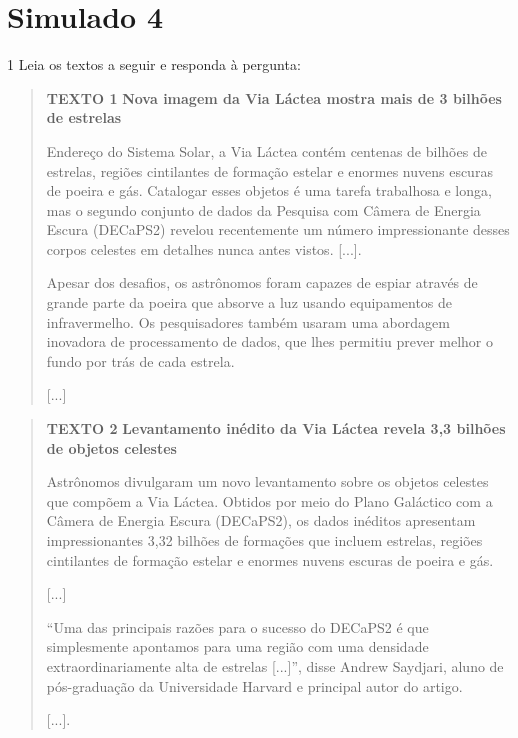 \chapter{Simulado 4}

\num{1} Leia os textos a seguir e responda à pergunta:

\begin{quote}
\textbf{TEXTO 1}
\textbf{Nova imagem da Via Láctea mostra mais de 3 bilhões de
estrelas}

Endereço do Sistema Solar, a Via Láctea contém centenas de bilhões de
estrelas, regiões cintilantes de formação estelar e enormes nuvens
escuras de poeira e gás. Catalogar esses objetos é uma tarefa trabalhosa
e longa, mas o segundo conjunto de dados da Pesquisa com Câmera de
Energia Escura (DECaPS2) revelou recentemente um número impressionante
desses corpos celestes em detalhes nunca antes vistos. {[}...{]}.

Apesar dos desafios, os astrônomos foram capazes de espiar através de
grande parte da poeira que absorve a luz usando equipamentos de
infravermelho. Os pesquisadores também usaram uma abordagem inovadora de
processamento de dados, que lhes permitiu prever melhor o fundo por trás
de cada estrela.

{[}...{]}

\end{quote}

\begin{quote}
\textbf{TEXTO 2}
\textbf{Levantamento inédito da Via Láctea revela 3,3 bilhões
de objetos celestes}

Astrônomos divulgaram um novo levantamento sobre os objetos celestes
que compõem a Via Láctea. Obtidos por meio do Plano Galáctico com a
Câmera de Energia Escura (DECaPS2), os dados inéditos apresentam
impressionantes 3,32 bilhões de formações que incluem estrelas, regiões
cintilantes de formação estelar e enormes nuvens escuras de poeira e
gás.

{[}...{]}

“Uma das principais razões para o sucesso do DECaPS2 é que simplesmente
apontamos para uma região com uma densidade extraordinariamente alta de
estrelas {[}...{]}”, disse Andrew Saydjari, aluno de pós-graduação da
Universidade Harvard e principal autor do artigo.

{[}...{]}.

\end{quote}

